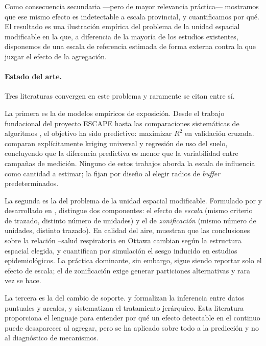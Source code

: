 \documentclass[10pt,twocolumn,a4paper]{article}
\begin{document}
Como consecuencia secundaria ---pero de mayor relevancia práctica--- mostramos
que ese mismo efecto es indetectable a escala provincial, y cuantificamos por
qué. El resultado es una ilustración empírica del problema de la unidad
espacial modificable \citep{openshaw1984,openshaw1979} en la que, a diferencia
de la mayoría de los estudios existentes, disponemos de una escala de
referencia estimada de forma externa contra la que juzgar el efecto de la
agregación.

\paragraph{Estado del arte.} Tres literaturas convergen en este problema y
raramente se citan entre sí.

La primera es la de modelos empíricos de exposición. Desde el trabajo
fundacional del proyecto ESCAPE \citep{beelen2013} hasta las comparaciones
sistemáticas de algoritmos \citep{chen2019}, el objetivo ha sido predictivo:
maximizar $R^2$ en validación cruzada. \citet{mercer2011} comparan
explícitamente kriging universal y regresión de uso del suelo, concluyendo que
la diferencia predictiva es menor que la variabilidad entre campañas de
medición. Ninguno de estos trabajos aborda la escala de influencia como
cantidad a estimar; la fijan por diseño al elegir radios de \emph{buffer}
predeterminados.

La segunda es la del problema de la unidad espacial modificable. Formulado por
\citet{openshaw1979} y desarrollado en \citet{openshaw1984}, distingue dos
componentes: el efecto de \emph{escala} (mismo criterio de trazado, distinto
número de unidades) y el de \emph{zonificación} (mismo número de unidades,
distinto trazado). En calidad del aire, \citet{parenteau2011} muestran que las
conclusiones sobre la relación --salud respiratoria en Ottawa cambian
según la estructura espacial elegida, y \citet{lee2020maup} cuantifican por
simulación el sesgo inducido en estudios epidemiológicos. La práctica
dominante, sin embargo, sigue siendo reportar solo el efecto de escala; el de
zonificación exige generar particiones alternativas y rara vez se hace.

La tercera es la del cambio de soporte. \citet{gelfand2001} y
\citet{gotway2002} formalizan la inferencia entre datos puntuales y areales, y
\citet{banerjee2014} sistematizan el tratamiento jerárquico. Esta literatura
proporciona el lenguaje para entender por qué un efecto detectable en el
continuo puede desaparecer al agregar, pero se ha aplicado sobre todo a la
predicción y no al diagnóstico de mecanismos.
\end{document}
